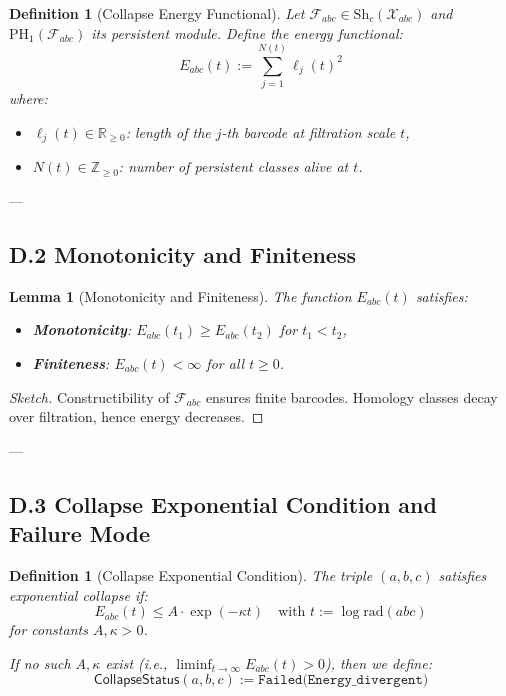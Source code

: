 \documentclass[11pt]{article}
\newtheorem{definition}[theorem]{Definition}
\newtheorem{lemma}[theorem]{Lemma}
\begin{document}
\begin{definition}[Collapse Energy Functional]
Let \( \mathcal{F}_{abc} \in \mathrm{Sh}_c(\mathcal{X}_{abc}) \) and \( \mathrm{PH}_1(\mathcal{F}_{abc}) \) its persistent module.  
Define the energy functional:
\[
E_{abc}(t) := \sum_{j=1}^{N(t)} \ell_j(t)^2
\]
where:
\begin{itemize}
  \item \( \ell_j(t) \in \mathbb{R}_{\geq 0} \): length of the \( j \)-th barcode at filtration scale \( t \),
  \item \( N(t) \in \mathbb{Z}_{\geq 0} \): number of persistent classes alive at \( t \).
\end{itemize}
\end{definition}

---

\subsection*{D.2 Monotonicity and Finiteness}

\begin{lemma}[Monotonicity and Finiteness]
The function \( E_{abc}(t) \) satisfies:
\begin{itemize}
  \item \textbf{Monotonicity}: \( E_{abc}(t_1) \geq E_{abc}(t_2) \) for \( t_1 < t_2 \),
  \item \textbf{Finiteness}: \( E_{abc}(t) < \infty \) for all \( t \geq 0 \).
\end{itemize}
\end{lemma}

\begin{proof}[Sketch]
Constructibility of \( \mathcal{F}_{abc} \) ensures finite barcodes.  
Homology classes decay over filtration, hence energy decreases.
\end{proof}

---

\subsection*{D.3 Collapse Exponential Condition and Failure Mode}

\begin{definition}[Collapse Exponential Condition]
The triple \( (a,b,c) \) satisfies exponential collapse if:
\[
E_{abc}(t) \leq A \cdot \exp(-\kappa t)
\quad \text{with } t := \log \mathrm{rad}(abc)
\]
for constants \( A, \kappa > 0 \).

\medskip
If no such \( A, \kappa \) exist (i.e., \( \liminf_{t \to \infty} E_{abc}(t) > 0 \)), then we define:
\[
\mathsf{CollapseStatus}(a,b,c) := \texttt{Failed(Energy\_divergent)}
\]
\end{definition}
\end{document}
